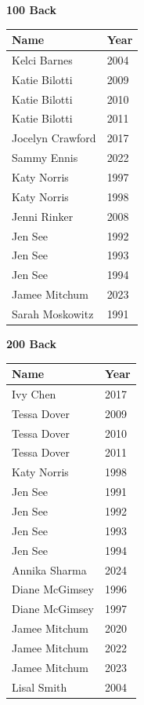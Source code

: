 \noindent\begin{minipage}[t]{0.48\textwidth}
\centering
\textbf{\textcolor{teamprimary}{100 Back}}\par
\vspace{0.5em}
\centering
\small
\renewcommand{\arraystretch}{1.0}
\setlength{\tabcolsep}{4pt}
\begin{tabular}{@{}p{3.0cm}p{1.0cm}@{}}
\toprule
\textbf{Name} & \textbf{Year} \\
\midrule
Kelci Barnes & 2004 \\
Katie Bilotti & 2009 \\
Katie Bilotti & 2010 \\
Katie Bilotti & 2011 \\
Jocelyn Crawford & 2017 \\
Sammy Ennis & 2022 \\
Katy Norris & 1997 \\
Katy Norris & 1998 \\
Jenni Rinker & 2008 \\
Jen See & 1992 \\
Jen See & 1993 \\
Jen See & 1994 \\
Jamee Mitchum & 2023 \\
Sarah Moskowitz & 1991 \\
\bottomrule
\end{tabular}
\end{minipage}
\hfill
\begin{minipage}[t]{0.48\textwidth}
\centering
\textbf{\textcolor{teamprimary}{200 Back}}\par
\vspace{0.5em}
\centering
\small
\renewcommand{\arraystretch}{1.0}
\setlength{\tabcolsep}{4pt}
\begin{tabular}{@{}p{3.0cm}p{1.0cm}@{}}
\toprule
\textbf{Name} & \textbf{Year} \\
\midrule
Ivy Chen & 2017 \\
Tessa Dover & 2009 \\
Tessa Dover & 2010 \\
Tessa Dover & 2011 \\
Katy Norris & 1998 \\
Jen See & 1991 \\
Jen See & 1992 \\
Jen See & 1993 \\
Jen See & 1994 \\
Annika Sharma & 2024 \\
Diane McGimsey & 1996 \\
Diane McGimsey & 1997 \\
Jamee Mitchum & 2020 \\
Jamee Mitchum & 2022 \\
Jamee Mitchum & 2023 \\
Lisal Smith & 2004 \\
\bottomrule
\end{tabular}
\end{minipage}
